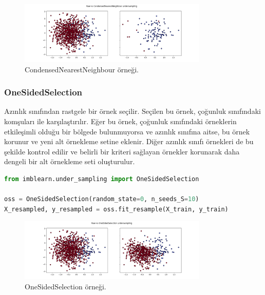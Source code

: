 \begin{figure}[h]
    \centering
    \includegraphics[width=0.8\textwidth]{images/Raw vs CondensedNearestNeighbour undersampling.png}
    \caption{CondensedNearestNeighbour örneği.}
    \label{fig:enter-label}
\end{figure}

\newpage

\subsubsection{OneSidedSelection}
Azınlık sınıfından rastgele bir örnek seçilir. Seçilen bu örnek, çoğunluk sınıfındaki komşuları ile karşılaştırılır. Eğer bu örnek, çoğunluk sınıfındaki örneklerin etkileşimli olduğu bir bölgede bulunmuyorsa ve azınlık sınıfına aitse, bu örnek korunur ve yeni alt örnekleme setine eklenir. Diğer azınlık sınıfı örnekleri de bu şekilde kontrol edilir ve belirli bir kriteri sağlayan örnekler korunarak daha dengeli bir alt örnekleme seti oluşturulur.

\begin{lstlisting}[language=Python]
from imblearn.under_sampling import OneSidedSelection

oss = OneSidedSelection(random_state=0, n_seeds_S=10)
X_resampled, y_resampled = oss.fit_resample(X_train, y_train)
\end{lstlisting}

\begin{figure}[h]
    \centering
    \includegraphics[width=0.8\textwidth]{images/Raw vs OneSidedSelection undersampling.png}
    \caption{OneSidedSelection örneği.}
    \label{fig:enter-label}
\end{figure}

\newpage

